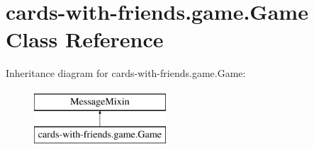\hypertarget{classcards-with-friends_1_1game_1_1_game}{\section{cards-\/with-\/friends.game.\-Game Class Reference}
\label{classcards-with-friends_1_1game_1_1_game}
}
Inheritance diagram for cards-\/with-\/friends.game.\-Game\-:\begin{figure}[H]
\begin{center}
\leavevmode
\includegraphics[height=2.000000cm]{classcards-with-friends_1_1game_1_1_game}
\end{center}
\end{figure}
